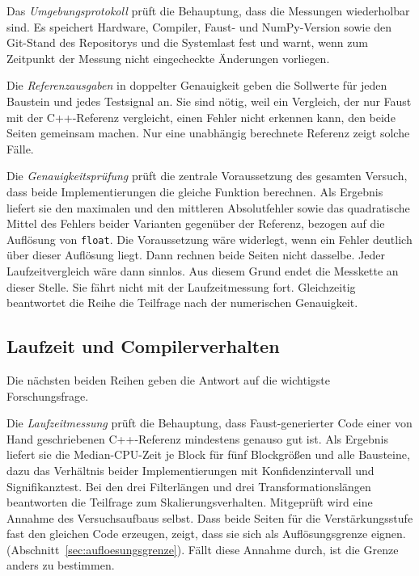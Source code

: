 Das \emph{Umgebungsprotokoll} prüft die Behauptung, dass die Messungen
wiederholbar sind. Es speichert Hardware, Compiler, Faust- und NumPy-Version sowie den
Git-Stand des Repositorys und die Systemlast fest und warnt, wenn zum Zeitpunkt der Messung nicht eingecheckte Änderungen vorliegen.

Die \emph{Referenzausgaben} in doppelter Genauigkeit geben die Sollwerte für jeden Baustein und jedes Testsignal an. Sie sind nötig, weil ein Vergleich, der nur Faust mit der C++-Referenz vergleicht, einen Fehler nicht erkennen kann, den beide Seiten gemeinsam machen. Nur eine unabhängig berechnete Referenz zeigt solche Fälle.

Die \emph{Genauigkeitsprüfung} prüft die zentrale Voraussetzung des gesamten
Versuch, dass beide Implementierungen die gleiche Funktion berechnen.
Als Ergebnis liefert sie den maximalen und den mittleren Absolutfehler sowie
das quadratische Mittel des Fehlers beider Varianten gegenüber der Referenz,
bezogen auf die Auflösung von \texttt{float}. Die Voraussetzung wäre widerlegt, wenn ein Fehler deutlich über dieser Auflösung liegt. Dann rechnen beide Seiten nicht dasselbe. Jeder Laufzeitvergleich wäre dann sinnlos. Aus diesem Grund endet die Messkette an dieser Stelle. Sie fährt nicht mit der Laufzeitmessung fort. Gleichzeitig beantwortet die Reihe die Teilfrage nach der numerischen Genauigkeit.

\subsection{Laufzeit und Compilerverhalten}

Die nächsten beiden Reihen geben die Antwort auf die wichtigste Forschungsfrage.

Die \emph{Laufzeitmessung} prüft die Behauptung, dass Faust-generierter Code
einer von Hand geschriebenen C++-Referenz mindestens genauso gut ist. Als
Ergebnis liefert sie die Median-CPU-Zeit je Block für fünf Blockgrößen und
alle Bausteine, dazu das Verhältnis beider Implementierungen mit
Konfidenzintervall und Signifikanztest. Bei den drei Filterlängen und drei
Transformationslängen beantworten die Teilfrage zum Skalierungsverhalten. Mitgeprüft wird eine Annahme des Versuchsaufbaus
selbst. Dass beide Seiten für die Verstärkungsstufe fast den gleichen Code erzeugen, zeigt, dass sie sich als Auflösungsgrenze eignen.
(Abschnitt~\ref{sec:aufloesungsgrenze}). Fällt diese Annahme durch, ist die
Grenze anders zu bestimmen.

